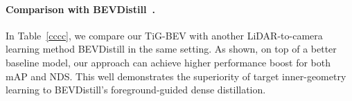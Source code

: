 \paragraph{Comparison with BEVDistill~\cite{b9}.} 
In Table~\ref{cccc}, we compare our TiG-BEV with another LiDAR-to-camera learning method BEVDistill in the same setting. As shown, on top of a better baseline model, our approach can achieve higher performance boost for both mAP and NDS. This well demonstrates the superiority of target inner-geometry learning to BEVDistill's foreground-guided dense distillation.




